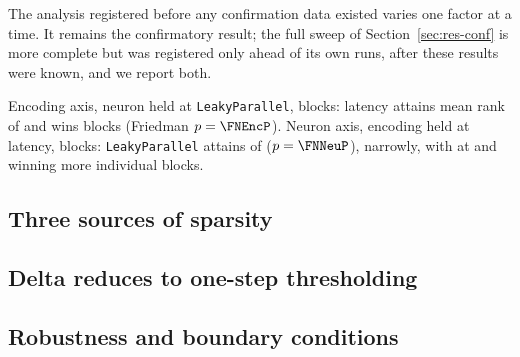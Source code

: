 The analysis registered before any confirmation data existed varies one factor
at a time. It remains the confirmatory result; the full sweep of
Section~\ref{sec:res-conf} is more complete but was registered only ahead of its
own runs, after these results were known, and we report both.

Encoding axis, neuron held at \texttt{LeakyParallel}, \FNEncBlocks{} blocks:
latency attains mean rank \FNEncRank{} of \FNEncLevels{} and wins \FNEncWins{}
blocks (Friedman $p=\FNEncP$). Neuron axis, encoding held at latency,
\FNNeuBlocks{} blocks: \texttt{LeakyParallel} attains \FNNeuRank{} of
\FNNeuLevels{} ($p=\FNNeuP$), narrowly, with \FNNeuRunnerUp{} at
\FNNeuRunnerUpRank{} and \FNNeuMostWins{} winning more individual blocks.


\subsection{Three sources of sparsity}
\label{sec:res-sparsity}


\subsection{Delta reduces to one-step thresholding}
\label{sec:res-delta}


\subsection{Robustness and boundary conditions}
\label{sec:res-limits}

